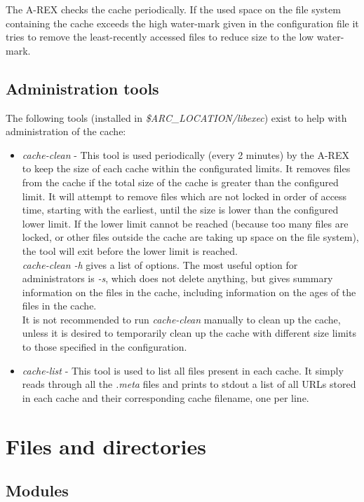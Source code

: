 \documentclass{article}                            %
\begin{document}
The A-REX checks the cache periodically. If the used space on the file
system containing the cache exceeds the high water-mark given in the
configuration file it tries to remove the least-recently accessed
files to reduce size to the low water-mark.


\subsection{Administration tools}

The following tools (installed in \emph{\$ARC\_LOCATION/libexec})
exist to help with administration of the cache:

\begin{itemize}
\item \emph{cache-clean} - This tool is used periodically (every 2 minutes)
by the A-REX to keep the size of each cache within the configurated limits.
It removes files from the cache if the total size of the cache is
greater than the configured limit. It will attempt to remove files
which are not locked in order of access time, starting with the earliest,
until the size is lower than the configured lower limit. If the lower
limit cannot be reached (because too many files are locked, or other
files outside the cache are taking up space on the file system), the
tool will exit before the lower limit is reached.\\
\emph{cache-clean -h} gives a list of options. The most useful option
for administrators is \emph{-s}, which does not delete anything, but
gives summary information on the files in the cache, including information
on the ages of the files in the cache.\\
It is not recommended to run \emph{cache-clean }manually to clean
up the cache, unless it is desired to temporarily clean up the cache
with different size limits to those specified in the configuration.
\item \emph{cache-list} - This tool is used to list all files present in
each cache. It simply reads through all the \emph{.meta }files and
prints to stdout a list of all URLs stored in each cache and their
corresponding cache filename, one per line.
\end{itemize}

\section{Files and directories\label{sec:files and directories}}

\subsection{Modules}
\end{document}
